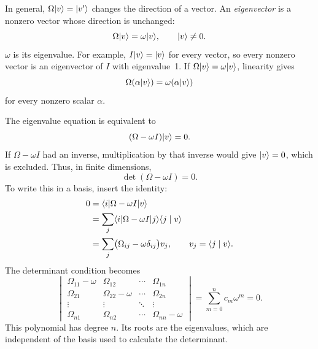 In general, $\Omega\lvert v\rangle=\lvert v'\rangle$ changes the direction of a vector.
An \emph{eigenvector} is a nonzero vector whose direction is unchanged:
\[
 \Omega\lvert v\rangle=\omega\lvert v\rangle,\qquad \lvert v\rangle\ne0.
\]
$\omega$ is its eigenvalue. For example, $I\lvert v\rangle=\lvert v\rangle$ for every
vector, so every nonzero vector is an eigenvector of $I$ with eigenvalue~1.
If $\Omega\lvert v\rangle=\omega\lvert v\rangle$, linearity gives
\[
 \Omega(\alpha\lvert v\rangle)=\omega(\alpha\lvert v\rangle)
\]
for every nonzero scalar $\alpha$.

The eigenvalue equation is equivalent to
\[
 (\Omega-\omega I)\lvert v\rangle=0.
\]
If $\Omega-\omega I$ had an inverse, multiplication by that inverse
would give $\lvert v\rangle=0$, which is excluded. Thus, in finite dimensions,
\[
 \boxed{\det(\Omega-\omega I)=0.}
\]
To write this in a basis, insert the identity:
\begin{align*}
 0&=\langle i\rvert \Omega-\omega I\lvert v\rangle\\
  &=\sum_j\langle i\rvert \Omega-\omega I\lvert j\rangle\langle j\mid v\rangle\\
  &=\sum_j\bigl(\Omega_{ij}-\omega\delta_{ij}\bigr)v_j,
 \qquad v_j=\langle j\mid v\rangle.
\end{align*}
The determinant condition becomes
\[
 \begin{vmatrix}
 \Omega_{11}-\omega&\Omega_{12}&\cdots&\Omega_{1n}\\
 \Omega_{21}&\Omega_{22}-\omega&\cdots&\Omega_{2n}\\
 \vdots&\vdots&\ddots&\vdots\\
 \Omega_{n1}&\Omega_{n2}&\cdots&\Omega_{nn}-\omega
 \end{vmatrix}
 =\sum_{m=0}^{n}c_m\omega^m=0.
\]
This polynomial has degree $n$. Its roots are the eigenvalues, which
are independent of the basis used to calculate the determinant.

